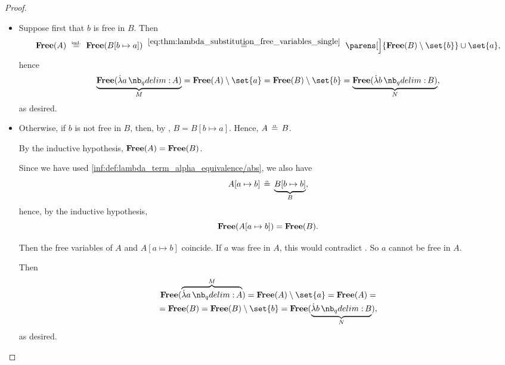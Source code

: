 \begin{proof}
\begin{itemize}
    \begin{itemize}
      \item Suppose first that \( b \) is free in \( B \). Then
      \begin{equation*}
        \op*{Free}(A)
        \reloset{\T{ind.}} =
        \op*{Free}(B[b \mapsto a])
        \reloset {\eqref{eq:thm:lambda_substitution_free_variables_single}} =
        \parens[\Big]{ \op*{Free}(B) \setminus \set{ b } } \cup \set{ a },
      \end{equation*}
      hence
      \begin{equation*}
        \underbrace{\op*{Free}(\qabs a A)}_M
        =
        \op*{Free}(A) \setminus \set{ a }
        =
        \op*{Free}(B) \setminus \set{ b }
        =
        \underbrace{\op*{Free}(\qabs b B)}_N,
      \end{equation*}
      as desired.

      \item Otherwise, if \( b \) is not free in \( B \), then, by , \( B = B[b \mapsto a] \). Hence, \( A \aequiv B \).

      By the inductive hypothesis, \( \op*{Free}(A) = \op*{Free}(B) \).

      Since we have used \ref{inf:def:lambda_term_alpha_equivalence/abs}, we also have
      \begin{equation*}
        A[a \mapsto b] \aequiv \underbrace{B[b \mapsto b]}_B,
      \end{equation*}
      hence, by the inductive hypothesis,
      \begin{equation*}
        \op*{Free}(A[a \mapsto b]) = \op*{Free}(B).
      \end{equation*}

      Then the free variables of \( A \) and \( A[a \mapsto b] \) coincide. If \( a \) was free in \( A \), this would contradict . So \( a \) cannot be free in \( A \).

      Then
      \begin{multline*}
        \op*{Free}(\overbrace{\qabs a A}^M)
        =
        \op*{Free}(A) \setminus \set{ a }
        =
        \op*{Free}(A)
        = \\ =
        \op*{Free}(B)
        =
        \op*{Free}(B) \setminus \set{ b }
        =
        \op*{Free}(\underbrace{\qabs b B}_N),
      \end{multline*}
      as desired.
    \end{itemize}
  \end{itemize}


\end{proof}

